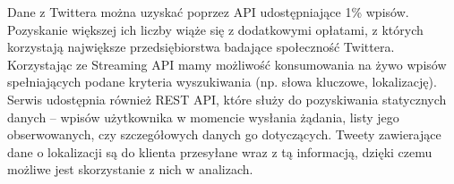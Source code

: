 Dane z Twittera można uzyskać poprzez API udostępniające 1\% wpisów.
Pozyskanie większej ich liczby wiąże się z dodatkowymi opłatami, z których
korzystają największe przedsiębiorstwa badające społeczność Twittera.
Korzystając ze Streaming API mamy możliwość konsumowania na żywo
wpisów spełniających podane kryteria wyszukiwania (np. słowa kluczowe, lokalizację).
Serwis udostępnia również REST API, które służy do pozyskiwania statycznych danych
-- wpisów użytkownika w momencie wysłania żądania, listy jego obserwowanych,
czy szczegółowych danych go dotyczących. Tweety zawierające dane o lokalizacji
są do klienta przesyłane wraz z tą informacją, dzięki czemu możliwe jest
skorzystanie z nich w analizach.

